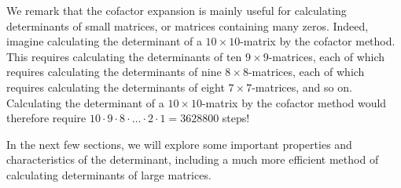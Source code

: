 We remark that the cofactor expansion is mainly useful for calculating
determinants of small matrices, or matrices containing many
zeros. Indeed, imagine calculating the determinant of a
$10\times 10$-matrix by the cofactor method. This requires calculating
the determinants of ten $9\times 9$-matrices, each of which requires
calculating the determinants of nine $8\times 8$-matrices, each of
which requires calculating the determinants of eight
$7\times 7$-matrices, and so on. Calculating the determinant of a
$10\times 10$-matrix by the cofactor method would therefore require
$10\cdot 9\cdot 8\cdot \ldots \cdot 2\cdot 1 = 3628800$ steps! 

In the next few sections, we will explore some important properties
and characteristics of the determinant, including a much more
efficient method of calculating determinants of large matrices.
